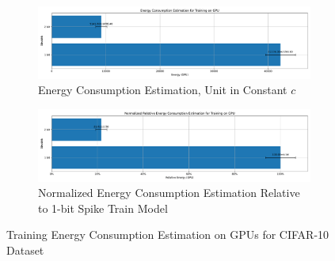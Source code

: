         \begin{figure}[H]
            \centering
            \begin{subfigure}[H]{0.48\textwidth}
                \includegraphics[width=\textwidth]{../timesteps/CIFAR10/plots/cifar10_train_energy_gpu.pdf}
                \caption{Energy Consumption Estimation, Unit in Constant $c$}
            \end{subfigure}
            \hfill
            \begin{subfigure}[H]{0.48\textwidth}
                \includegraphics[width=\textwidth]{../timesteps/CIFAR10/plots/cifar10_train_relative_energy_gpu.pdf}
                \caption{Normalized Energy Consumption Estimation Relative to 1-bit Spike Train Model}
            \end{subfigure}
            \caption{Training Energy Consumption Estimation on GPUs for CIFAR-10 Dataset}
        \end{figure}

